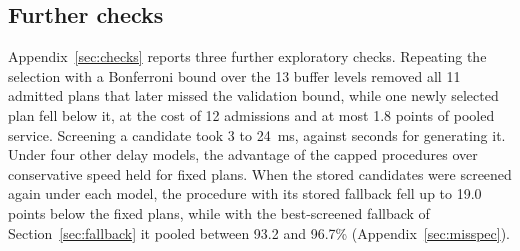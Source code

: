 \subsection{Further checks}\label{sec:checks-summary}

Appendix~\ref{sec:checks} reports three further exploratory checks. Repeating the selection with a Bonferroni bound over the 13 buffer levels removed all 11 admitted plans that later missed the validation bound, while one newly selected plan fell below it, at the cost of 12 admissions and at most 1.8 points of pooled service. Screening a candidate took 3 to 24~ms, against seconds for generating it. Under four other delay models, the advantage of the capped procedures over conservative speed held for fixed plans. When the stored candidates were screened again under each model, the procedure with its stored fallback fell up to 19.0 points below the fixed plans, while with the best-screened fallback of Section~\ref{sec:fallback} it pooled between 93.2 and 96.7\% (Appendix~\ref{sec:misspec}).
